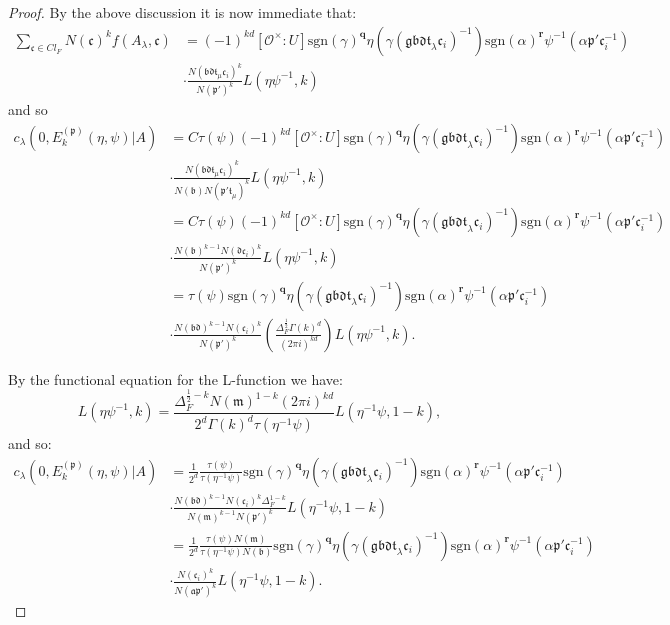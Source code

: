 \documentclass[a4paper,oneside]{amsart}
\theoremstyle{plain}
\theoremstyle{definition}
\begin{document}
\begin{proof}
By the above discussion it is now immediate that: \begin{align*} \sum_{\mathfrak{c}\in Cl_F}N(\mathfrak{c})^k f(A_{\lambda},\mathfrak{c}) &= (-1)^{kd}[\mathcal{O}^{\times}:U]\text{sgn}(\gamma)^{\textbf{q}}\eta(\gamma (\mathfrak{gbdt}_{\lambda}\mathfrak{c}_i)^{-1})\text{sgn}(\alpha)^{\textbf{r}}\psi^{-1}(\alpha\mathfrak{p'}\mathfrak{c}_i^{-1})\\ &\cdot\frac{N(\mathfrak{bdt}_{\mu}\mathfrak{c}_i)^k}{N(\mathfrak{p'})^k}L(\eta\psi^{-1},k)\end{align*} and so \begin{align*} c_{\lambda}(0,E_k^{(\mathfrak{p})}(\eta,\psi)|A) &=C\tau(\psi)(-1)^{kd}[\mathcal{O}^{\times}:U]\text{sgn}(\gamma)^{\textbf{q}}\eta(\gamma (\mathfrak{gbdt}_{\lambda}\mathfrak{c}_i)^{-1})\text{sgn}(\alpha)^{\textbf{r}}\psi^{-1}(\alpha\mathfrak{p'}\mathfrak{c}_i^{-1})\\ &\cdot\frac{N(\mathfrak{bdt}_{\mu}\mathfrak{c}_i)^k}{N(\mathfrak{b})N(\mathfrak{p't}_{\mu})^{k}}L(\eta\psi^{-1},k)\\ &=C\tau(\psi)(-1)^{kd}[\mathcal{O}^{\times}:U]\text{sgn}(\gamma)^{\textbf{q}}\eta(\gamma (\mathfrak{gbdt}_{\lambda}\mathfrak{c}_i)^{-1})\text{sgn}(\alpha)^{\textbf{r}}\psi^{-1}(\alpha\mathfrak{p'}\mathfrak{c}_i^{-1})\\ &\cdot\frac{N(\mathfrak{b})^{k-1}N(\mathfrak{dc}_i)^k}{N(\mathfrak{p'})^{k}}L(\eta\psi^{-1},k)\\ &= \tau(\psi)\text{sgn}(\gamma)^{\textbf{q}}\eta(\gamma (\mathfrak{gbdt}_{\lambda}\mathfrak{c}_i)^{-1})\text{sgn}(\alpha)^{\textbf{r}}\psi^{-1}(\alpha\mathfrak{p'}\mathfrak{c}_i^{-1})\\ &\cdot\frac{N(\mathfrak{bd})^{k-1}N(\mathfrak{c}_i)^k}{N(\mathfrak{p'})^{k}}\left(\frac{\Delta_F^{\frac{1}{2}}\Gamma(k)^d}{(2\pi i)^{kd}}\right)L(\eta\psi^{-1},k).\end{align*}

By the functional equation for the L-function we have: \[L(\eta\psi^{-1},k) = \frac{\Delta_F^{\frac{1}{2}-k}N(\mathfrak{m})^{1-k}(2\pi i)^{kd}}{2^d \Gamma(k)^d \tau(\eta^{-1}\psi)}L(\eta^{-1}\psi,1-k),\] and so: \begin{align*} c_{\lambda}(0,E_k^{(\mathfrak{p})}(\eta,\psi)|A) &= \frac{1}{2^d}\frac{\tau(\psi)}{\tau(\eta^{-1}\psi)}\text{sgn}(\gamma)^{\textbf{q}}\eta(\gamma (\mathfrak{gbdt}_{\lambda}\mathfrak{c}_i)^{-1})\text{sgn}(\alpha)^{\textbf{r}}\psi^{-1}(\alpha\mathfrak{p'}\mathfrak{c}_i^{-1})\\ &\cdot\frac{N(\mathfrak{bd})^{k-1}N(\mathfrak{c}_i)^k\Delta_F^{1-k}}{N(\mathfrak{m})^{k-1}N(\mathfrak{p'})^{k}}L(\eta^{-1}\psi,1-k)\\ &= \frac{1}{2^d}\frac{\tau(\psi)N(\mathfrak{m})}{\tau(\eta^{-1}\psi)N(\mathfrak{b})}\text{sgn}(\gamma)^{\textbf{q}}\eta(\gamma (\mathfrak{gbdt}_{\lambda}\mathfrak{c}_i)^{-1})\text{sgn}(\alpha)^{\textbf{r}}\psi^{-1}(\alpha\mathfrak{p'}\mathfrak{c}_i^{-1})\\ &\cdot\frac{N(\mathfrak{c}_i)^k}{N(\mathfrak{ap'})^{k}}L(\eta^{-1}\psi,1-k).\end{align*}


\end{proof}
\end{document}
